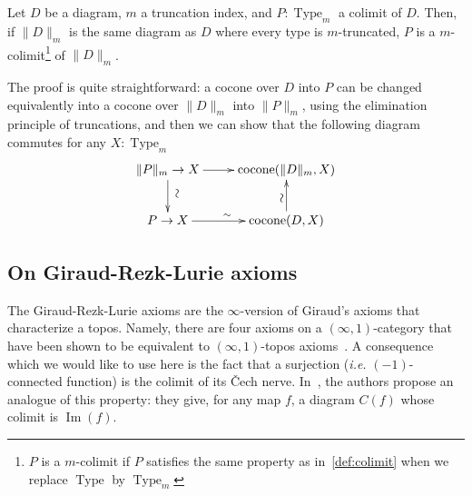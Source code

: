 \documentclass[notfinal]{jfrarticle}
\DeclareMathOperator{\Type}{Type}
\DeclareMathOperator{\im}{Im}
\newcommand \colim {\mathrm{colim}}
\newcommand{\ie}{\emph{i.e.}}
\begin{document}
\begin{lem}
  Let $D$ be a diagram, $m$ a truncation index, and
  $P:\Type_{m}$ a colimit of $D$. 
  Then, if $\|D\|_m$ is the same diagram as $D$ where every type
  is $m$-truncated, $P$ is a $m$-colimit\footnote{$P$ is a $m$-colimit
    if $P$ satisfies the same property as in~\ref{def:colimit} when
    we replace $\Type$ by $\Type_m$} of $\|D\|_m$.
\end{lem}
The proof is quite straightforward: a cocone over $D$ into
$P$ can be changed equivalently into a cocone over $\|D\|_m$ into $\|P\|_m$, using the
elimination principle of truncations, and then
we can show that the following diagram commutes for any $X:\Type_m$
\[
  \xymatrix{
    \|P\|_m \to X \ar[r] \ar[d]^*[@]{\hbox to 0pt{\hss$\sim$\hss}} & \mathrm{cocone}(\|D\|_m,X) \\
    P \to X \ar[r]^\sim& \mathrm{cocone}(D,X) \ar[u]^*[@]{\hbox to 0pt{\hss$\sim$\hss}}
  }
\]



\subsection{On Giraud-Rezk-Lurie axioms}
\label{ssec:giraud-ax}


The Giraud-Rezk-Lurie axioms are the $\infty$-version of Giraud's
axioms that characterize a topos. Namely, there are four axioms on a
$(\infty,1)$-category that have been shown to be equivalent to
$(\infty,1)$-topos axioms~\cite[Chapter 6]{lurie}.
%
A consequence which we would like to use here is the fact that a surjection
(\ie{} $(-1)$-connected function) is the colimit of its \v{C}ech
nerve.
%
In~\cite{boulier}, the authors propose an analogue of this property:
they give, for any map $f$, a diagram $C(f)$ whose colimit is $\im(f)$.
\end{document}
